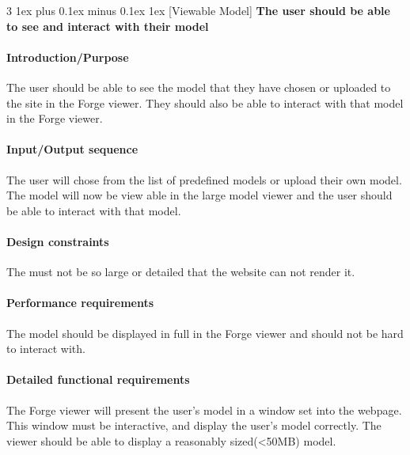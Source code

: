 \documentclass[letterpaper, 10pt, draftclsnofoot, compsoc, onecolumn]{IEEEtran}
\makeatletter
\def\subsubsection{\@startsection{subsubsection}%
                                 {3}%
                                 {\z@}%
                                 {1ex plus 0.1ex minus 0.1ex}%
                                 {1ex}%
                                 {\normalfont\normalsize}}%
\makeatother
\begin{document}

\subsubsection[{Viewable Model}]{\rmfamily\bfseries\color{black}
	The user should be able to see and interact with their model
}
\smallskip
\paragraph[Introduction/Purpose of this
feature]{\rmfamily\bfseries\color{black}
Introduction/Purpose }
	The user should be able to see the model that they have chosen or uploaded to the site in the Forge viewer. They 
	should also be able to interact with that model in the Forge viewer. 

\paragraph[Input/Output sequence for this
feature]{\rmfamily\bfseries\color{black}
Input/Output sequence }
	The user will chose from the list of predefined models or upload their own model. The model will now be view able in the large 
	model viewer and the user should be able to interact with that model.

\paragraph[Design constraints of this
feature]{\rmfamily\bfseries\color{black} Design constraints }
	The must not be so large or detailed that the website can not render it.


\paragraph[Performance requirements of this
feature]{\rmfamily\bfseries\color{black}
Performance requirements }
	The model should be displayed in full in the Forge viewer and should not be hard to interact with. 

\paragraph[Detailed functional requirements of this
feature]{\rmfamily\bfseries\color{black}
Detailed functional requirements }
	The Forge viewer will present the user's model in a window set into the webpage. This window must be interactive, and display the 
	user's model correctly. The viewer should be able to display a reasonably sized(<50MB) model. 
\end{document}
